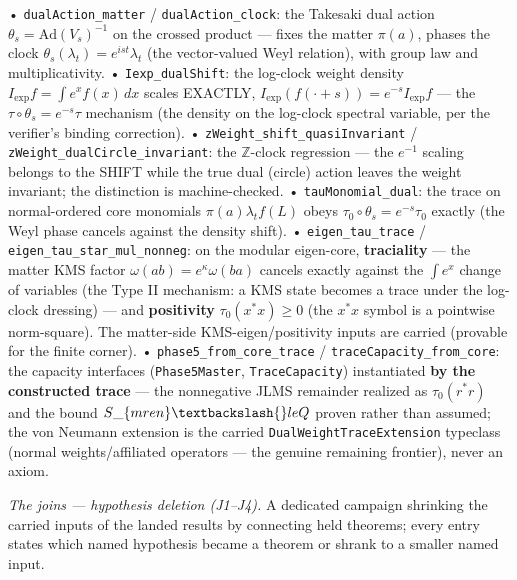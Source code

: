 \documentclass[11pt,a4paper]{article}
\begin{document}
  • \texttt{dualAction\_matter} / \texttt{dualAction\_clock}: the Takesaki dual action $\theta_s = \mathrm{Ad}(V_s)^{-1}$ on the crossed product — fixes the matter $\pi(a)$, phases the clock $\theta_s(\lambda_t)=e^{ist}\lambda_t$ (the vector-valued Weyl relation), with group law and multiplicativity.
  • \texttt{Iexp\_dualShift}: the log-clock weight density $I_{\exp}f=\int e^x f(x)\,dx$ scales EXACTLY, $I_{\exp}(f(\cdot{+}s))=e^{-s}I_{\exp}f$ — the $\tau\circ\theta_s=e^{-s}\tau$ mechanism (the density on the log-clock spectral variable, per the verifier's binding correction).
  • \texttt{zWeight\_shift\_quasiInvariant} / \texttt{zWeight\_dualCircle\_invariant}: the $\mathbb{Z}$-clock regression — the $e^{-1}$ scaling belongs to the SHIFT while the true dual (circle) action leaves the weight invariant; the distinction is machine-checked.
  • \texttt{tauMonomial\_dual}: the trace on normal-ordered core monomials $\pi(a)\lambda_t f(L)$ obeys $\tau_0\circ\theta_s=e^{-s}\tau_0$ exactly (the Weyl phase cancels against the density shift).
  • \texttt{eigen\_tau\_trace} / \texttt{eigen\_tau\_star\_mul\_nonneg}: on the modular eigen-core, \textbf{traciality} — the matter KMS factor $\omega(ab)=e^{\kappa}\omega(ba)$ cancels exactly against the $\int e^x$ change of variables (the Type II mechanism: a KMS state becomes a trace under the log-clock dressing) — and \textbf{positivity} $\tau_0(x^*x)\ge 0$ (the $x^*x$ symbol is a pointwise norm-square). The matter-side KMS-eigen/positivity inputs are carried (provable for the finite corner).
  • \texttt{phase5\_from\_core\_trace} / \texttt{traceCapacity\_from\_core}: the capacity interfaces (\texttt{Phase5Master}, \texttt{TraceCapacity}) instantiated \textbf{by the constructed trace} — the nonnegative JLMS remainder realized as $\tau_0(r^*r)$ and the bound $S\_\{
m ren\}\textbackslash\{\}le Q$ proven rather than assumed; the von Neumann extension is the carried \texttt{DualWeightTraceExtension} typeclass (normal weights/affiliated operators — the genuine remaining frontier), never an axiom.

\emph{The joins — hypothesis deletion (J1--J4).} A dedicated campaign shrinking the carried inputs of the landed results by connecting held theorems; every entry states which named hypothesis became a theorem or shrank to a smaller named input.
\end{document}
